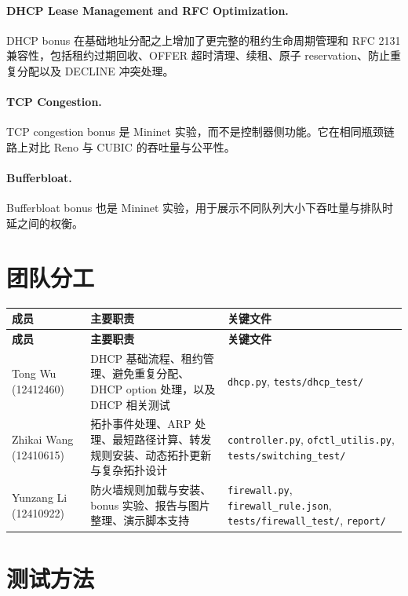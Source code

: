 \documentclass[11pt,a4paper]{ctexart}
\begin{document}
\paragraph{DHCP Lease Management and RFC Optimization.}
DHCP bonus 在基础地址分配之上增加了更完整的租约生命周期管理和 RFC 2131 兼容性，包括租约过期回收、OFFER 超时清理、续租、原子 reservation、防止重复分配以及 DECLINE 冲突处理。

\paragraph{TCP Congestion.}
TCP congestion bonus 是 Mininet 实验，而不是控制器侧功能。它在相同瓶颈链路上对比 Reno 与 CUBIC 的吞吐量与公平性。

\paragraph{Bufferbloat.}
Bufferbloat bonus 也是 Mininet 实验，用于展示不同队列大小下吞吐量与排队时延之间的权衡。

\section{团队分工}

\begin{longtable}{>{\raggedright\arraybackslash}p{} >{\raggedright\arraybackslash}p{} >{\raggedright\arraybackslash}p{}}
\toprule
\textbf{成员} & \textbf{主要职责} & \textbf{关键文件} \\
\midrule
\endfirsthead
\toprule
\textbf{成员} & \textbf{主要职责} & \textbf{关键文件} \\
\midrule
\endhead
Tong Wu (12412460) &
DHCP 基础流程、租约管理、避免重复分配、DHCP option 处理，以及 DHCP 相关测试 &
\texttt{dhcp.py}, \texttt{tests/dhcp\_test/} \\
\midrule
Zhikai Wang (12410615) &
拓扑事件处理、ARP 处理、最短路径计算、转发规则安装、动态拓扑更新与复杂拓扑设计 &
\texttt{controller.py}, \texttt{ofctl\_utilis.py}, \texttt{tests/switching\_test/} \\
\midrule
Yunzang Li (12410922) &
防火墙规则加载与安装、bonus 实验、报告与图片整理、演示脚本支持 &
\texttt{firewall.py}, \texttt{firewall\_rule.json}, \texttt{tests/firewall\_test/}, \texttt{report/} \\
\bottomrule
\end{longtable}

\section{测试方法}
\end{document}
